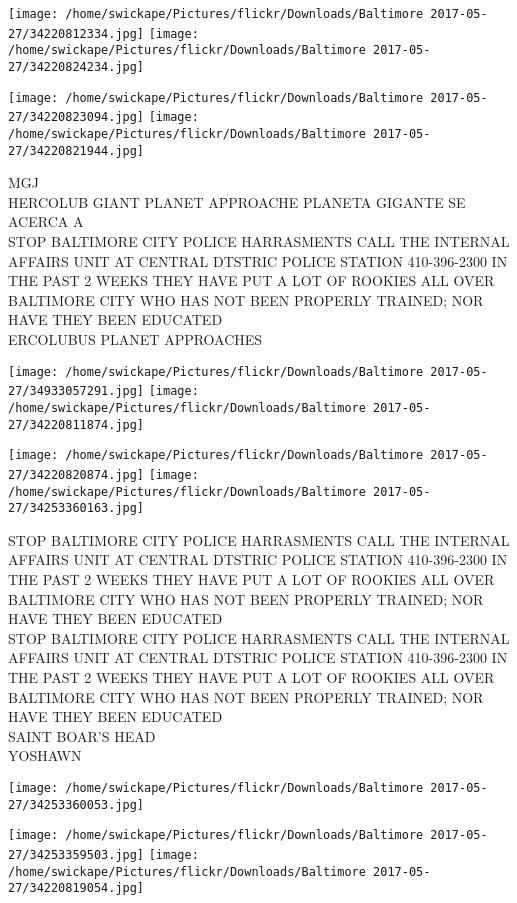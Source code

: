 \documentclass[10pt,letterpaper]{article}
\begin{document}
\texttt{[image: /home/swickape/Pictures/flickr/Downloads/Baltimore 2017-05-27/34220812334.jpg]}
\texttt{[image: /home/swickape/Pictures/flickr/Downloads/Baltimore 2017-05-27/34220824234.jpg]}

\texttt{[image: /home/swickape/Pictures/flickr/Downloads/Baltimore 2017-05-27/34220823094.jpg]}
\texttt{[image: /home/swickape/Pictures/flickr/Downloads/Baltimore 2017-05-27/34220821944.jpg]}

MGJ\\
HERCOLUB GIANT PLANET APPROACHE PLANETA GIGANTE SE ACERCA A\\
STOP BALTIMORE CITY POLICE HARRASMENTS CALL THE INTERNAL AFFAIRS UNIT AT CENTRAL DTSTRIC POLICE STATION 410{-}396{-}2300 IN THE PAST 2 WEEKS THEY HAVE PUT A LOT OF ROOKIES ALL OVER BALTIMORE CITY WHO HAS NOT BEEN PROPERLY TRAINED; NOR HAVE THEY BEEN EDUCATED\\
ERCOLUBUS PLANET APPROACHES\\
\pagebreak

\texttt{[image: /home/swickape/Pictures/flickr/Downloads/Baltimore 2017-05-27/34933057291.jpg]}
\texttt{[image: /home/swickape/Pictures/flickr/Downloads/Baltimore 2017-05-27/34220811874.jpg]}

\texttt{[image: /home/swickape/Pictures/flickr/Downloads/Baltimore 2017-05-27/34220820874.jpg]}
\texttt{[image: /home/swickape/Pictures/flickr/Downloads/Baltimore 2017-05-27/34253360163.jpg]}

STOP BALTIMORE CITY POLICE HARRASMENTS CALL THE INTERNAL AFFAIRS UNIT AT CENTRAL DTSTRIC POLICE STATION 410{-}396{-}2300 IN THE PAST 2 WEEKS THEY HAVE PUT A LOT OF ROOKIES ALL OVER BALTIMORE CITY WHO HAS NOT BEEN PROPERLY TRAINED; NOR HAVE THEY BEEN EDUCATED\\
STOP BALTIMORE CITY POLICE HARRASMENTS CALL THE INTERNAL AFFAIRS UNIT AT CENTRAL DTSTRIC POLICE STATION 410{-}396{-}2300 IN THE PAST 2 WEEKS THEY HAVE PUT A LOT OF ROOKIES ALL OVER BALTIMORE CITY WHO HAS NOT BEEN PROPERLY TRAINED; NOR HAVE THEY BEEN EDUCATED\\
SAINT BOAR'S HEAD\\
YOSHAWN\\
\pagebreak

\texttt{[image: /home/swickape/Pictures/flickr/Downloads/Baltimore 2017-05-27/34253360053.jpg]}

\vspace{0.25in}
\texttt{[image: /home/swickape/Pictures/flickr/Downloads/Baltimore 2017-05-27/34253359503.jpg]}
\texttt{[image: /home/swickape/Pictures/flickr/Downloads/Baltimore 2017-05-27/34220819054.jpg]}
\end{document}

